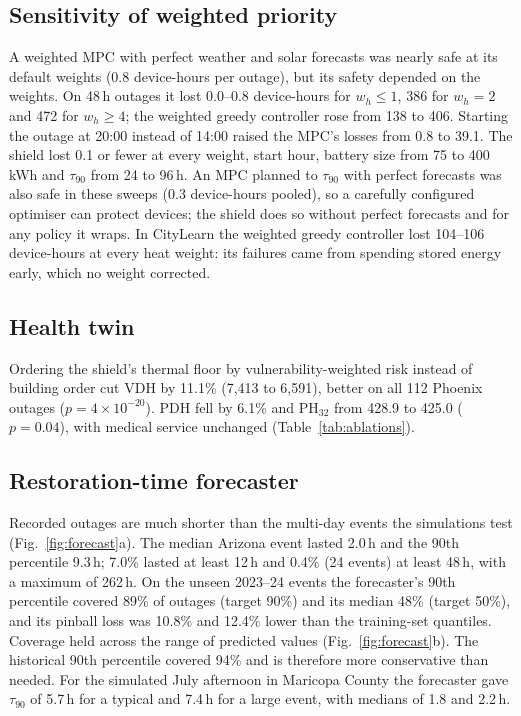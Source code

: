 \documentclass[conference]{IEEEtran}
\begin{document}
\subsection{Sensitivity of weighted priority}
A weighted MPC with perfect weather and solar forecasts was nearly safe at its default weights (0.8 device-hours per outage), but its safety depended on the weights. On 48\,h outages it lost 0.0--0.8 device-hours for $w_h\le1$, 386 for $w_h=2$ and 472 for $w_h\ge4$; the weighted greedy controller rose from 138 to 406. Starting the outage at 20:00 instead of 14:00 raised the MPC's losses from 0.8 to 39.1. The shield lost 0.1 or fewer at every weight, start hour, battery size from 75 to 400\,kWh and $\tau_{90}$ from 24 to 96\,h. An MPC planned to $\tau_{90}$ with perfect forecasts was also safe in these sweeps (0.3 device-hours pooled), so a carefully configured optimiser can protect devices; the shield does so without perfect forecasts and for any policy it wraps. In CityLearn the weighted greedy controller lost 104--106 device-hours at every heat weight: its failures came from spending stored energy early, which no weight corrected.

\subsection{Health twin}
Ordering the shield's thermal floor by vulnerability-weighted risk instead of building order cut VDH by 11.1\% (7,413 to 6,591), better on all 112 Phoenix outages ($p=4\times10^{-20}$). PDH fell by 6.1\% and PH$_{32}$ from 428.9 to 425.0 ($p=0.04$), with medical service unchanged (Table~\ref{tab:ablations}).

\subsection{Restoration-time forecaster}
Recorded outages are much shorter than the multi-day events the simulations test (Fig.~\ref{fig:forecast}a). The median Arizona event lasted 2.0\,h and the 90th percentile 9.3\,h; 7.0\% lasted at least 12\,h and 0.4\% (24 events) at least 48\,h, with a maximum of 262\,h. On the unseen 2023--24 events the forecaster's 90th percentile covered 89\% of outages (target 90\%) and its median 48\% (target 50\%), and its pinball loss was 10.8\% and 12.4\% lower than the training-set quantiles. Coverage held across the range of predicted values (Fig.~\ref{fig:forecast}b). The historical 90th percentile covered 94\% and is therefore more conservative than needed. For the simulated July afternoon in Maricopa County the forecaster gave $\tau_{90}$ of 5.7\,h for a typical and 7.4\,h for a large event, with medians of 1.8 and 2.2\,h.
\end{document}
